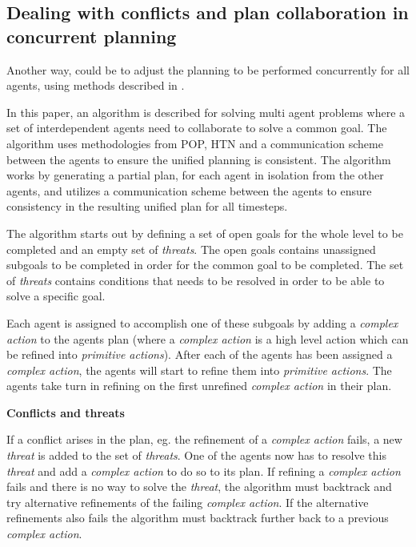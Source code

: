 \documentclass[Main]{subfiles}
\begin{document}
\subsection{Dealing with conflicts and plan collaboration in concurrent planning}

Another way, could be to adjust the planning to be performed concurrently for all agents, using methods described in \citep{pellier2007unified}.

In this paper, an algorithm is described for solving multi agent problems where a set of interdependent agents need to collaborate to solve a common goal.
The algorithm uses methodologies from POP, HTN and a communication scheme between the agents to ensure the unified planning is consistent.
The algorithm works by generating a partial plan, for each agent in isolation from the other agents, and utilizes a communication scheme between the agents to ensure consistency in the resulting unified plan for all timesteps.

The algorithm starts out by defining a set of open goals for the whole level to be completed and an empty set of \textit{threats}.
The open goals contains unassigned subgoals to be completed in order for the common goal to be completed.
The set of \textit{threats} contains conditions that needs to be resolved in order to be able to solve a specific goal.

Each agent is assigned to accomplish one of these subgoals by adding a \textit{complex action} to the agents plan (where a \textit{complex action} is a high level action which can be refined into \textit{primitive actions}).
After each of the agents has been assigned a \textit{complex action}, the agents will start to refine them into \textit{primitive actions}.
The agents take turn in refining on the first unrefined \textit{complex action} in their plan.


\textbf{Conflicts and threats}

If a conflict arises in the plan, eg. the refinement of a \textit{complex action} fails, a new \textit{threat} is added to the set of \textit{threats}.
One of the agents now has to resolve this \textit{threat} and add a \textit{complex action} to do so to its plan.
If refining a \textit{complex action} fails and there is no way to solve the \textit{threat}, the algorithm must backtrack and try alternative refinements of the failing \textit{complex action}. If the alternative refinements also fails the algorithm must backtrack further back to a previous \textit{complex action}.
\end{document}
